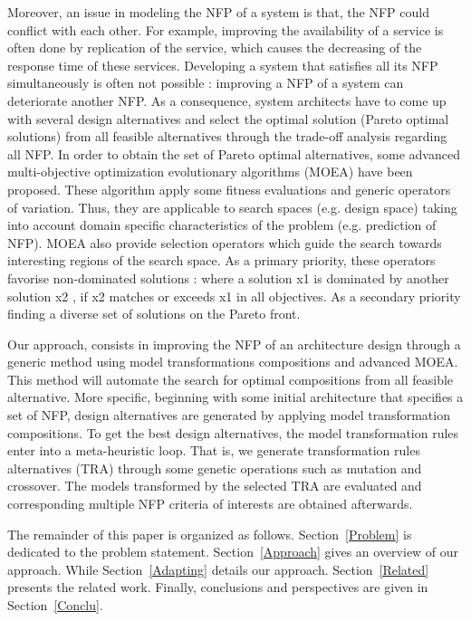 \documentclass[conference]{IEEEtran}
\begin{document}
Moreover, an issue in modeling the NFP of a system is that, the NFP could conflict with each other. For example, improving the availability of a service is often done by replication of the service, which causes the decreasing of the response time of these services\cite{Yu:2001:CLA:502059.502038}. Developing a system that satisfies all its NFP simultaneously is often not possible : improving a NFP of a system can deteriorate another NFP. As a consequence, system architects have to come up with several design alternatives and select the optimal solution (Pareto optimal solutions) from all feasible alternatives through the trade-off analysis regarding all NFP\cite{Coello98acomprehensive}.
In order to obtain the set of Pareto optimal alternatives, some advanced multi-objective optimization evolutionary algorithms (MOEA) have been proposed. These algorithm apply some fitness evaluations and generic operators of variation. Thus, they are applicable to search spaces (e.g. design space) taking into account domain specific characteristics of the problem (e.g. prediction of NFP). MOEA also provide selection operators which guide the search towards interesting regions of the search space. As a primary priority, these operators favorise non-dominated solutions : where a solution x1 is dominated by another solution x2 , if x2 matches or exceeds x1 in all objectives. As a secondary priority finding a diverse set of solutions on the Pareto front. 

Our approach, consists in improving the NFP of an architecture design through a generic method using model transformations compositions and advanced MOEA. This method will automate the search for optimal compositions from all feasible alternative. More specific, beginning with some initial architecture that specifies a set of NFP, design alternatives are generated by applying model transformation compositions\cite{Jouault:2005:TMA:2153686.2153705}. To get the best design alternatives, the model transformation rules enter into a meta-heuristic loop. That is, we generate transformation rules alternatives (TRA) through some genetic operations such as mutation and crossover. The models transformed by the selected TRA are evaluated and corresponding multiple NFP criteria of interests are obtained afterwards.

The remainder of this paper is organized as follows. Section~\ref{Problem} is dedicated to the problem statement. Section~\ref{Approach} gives an overview  of our approach. While Section~\ref{Adapting} details our approach. Section~\ref{Related} presents the related work. Finally, conclusions and perspectives are given in Section~\ref{Conclu}.
\end{document}
